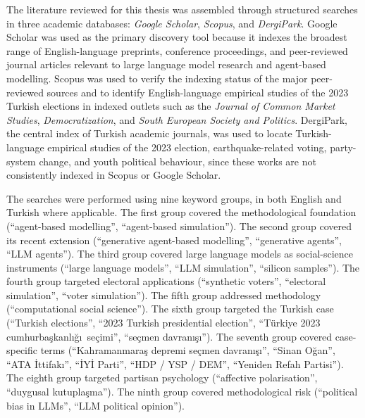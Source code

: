 \documentclass[12pt,a4paper]{report}
\begin{document}
The literature reviewed for this thesis was assembled through structured searches in three academic databases: \emph{Google Scholar}, \emph{Scopus}, and \emph{DergiPark}. Google Scholar was used as the primary discovery tool because it indexes the broadest range of English-language preprints, conference proceedings, and peer-reviewed journal articles relevant to large language model research and agent-based modelling. Scopus was used to verify the indexing status of the major peer-reviewed sources and to identify English-language empirical studies of the 2023 Turkish elections in indexed outlets such as the \emph{Journal of Common Market Studies}, \emph{Democratization}, and \emph{South European Society and Politics}. DergiPark, the central index of Turkish academic journals, was used to locate Turkish-language empirical studies of the 2023 election, earthquake-related voting, party-system change, and youth political behaviour, since these works are not consistently indexed in Scopus or Google Scholar.

The searches were performed using nine keyword groups, in both English and Turkish where applicable. The first group covered the methodological foundation (\enquote{agent-based modelling}, \enquote{agent-based simulation}). The second group covered its recent extension (\enquote{generative agent-based modelling}, \enquote{generative agents}, \enquote{LLM agents}). The third group covered large language models as social-science instruments (\enquote{large language models}, \enquote{LLM simulation}, \enquote{silicon samples}). The fourth group targeted electoral applications (\enquote{synthetic voters}, \enquote{electoral simulation}, \enquote{voter simulation}). The fifth group addressed methodology (\enquote{computational social science}). The sixth group targeted the Turkish case (\enquote{Turkish elections}, \enquote{2023 Turkish presidential election}, \enquote{T\"urkiye 2023 cumhurba\c{s}kanl\i\u{g}\i\ se\c{c}imi}, \enquote{se\c{c}men davran\i\c{s}\i}). The seventh group covered case-specific terms (\enquote{Kahramanmara\c{s} depremi se\c{c}men davran\i\c{s}\i}, \enquote{Sinan O\u{g}an}, \enquote{ATA \.Ittifak\i}, \enquote{\.IY\.I Parti}, \enquote{HDP / YSP / DEM}, \enquote{Yeniden Refah Partisi}). The eighth group targeted partisan psychology (\enquote{affective polarisation}, \enquote{duygusal kutupla\c{s}ma}). The ninth group covered methodological risk (\enquote{political bias in LLMs}, \enquote{LLM political opinion}).
\end{document}
